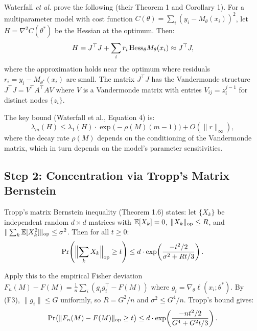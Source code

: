 Waterfall \emph{et al.}\cite{waterfall2006sloppy} prove the following (their Theorem 1 and Corollary 1). For a multiparameter model with cost function $C(\theta) = \sum_i (y_i - M_\theta(x_i))^2$, let $H = \nabla^2 C(\theta^*)$ be the Hessian at the optimum. Then:
\begin{equation}\label{eq:waterfall}
    H = J^\top J + \sum_i r_i \, \mathrm{Hess}_\theta M_\theta(x_i) \approx J^\top J,
\end{equation}
where the approximation holds near the optimum where residuals $r_i = y_i - M_{\theta^*}(x_i)$ are small. The matrix $J^\top J$ has the Vandermonde structure $J^\top J = V^\top A^\top A V$ where $V$ is a Vandermonde matrix with entries $V_{ij} = z_i^{j-1}$ for distinct nodes $\{z_i\}$.

The key bound (Waterfall et al., Equation 4) is:
\begin{equation}\label{eq:waterfall-bound}
    \lambda_m(H) \leq \lambda_1(H) \cdot \exp\bigl(-\rho(M)(m-1)\bigr) + O(\|r\|_\infty),
\end{equation}
where the decay rate $\rho(M)$ depends on the conditioning of the Vandermonde matrix, which in turn depends on the model's parameter sensitivities.

\subsection{Step 2: Concentration via Tropp's Matrix Bernstein}

Tropp's matrix Bernstein inequality\cite{tropp2012user} (Theorem 1.6) states: let $\{X_k\}$ be independent random $d \times d$ matrices with $\mathbb{E}[X_k] = 0$, $\|X_k\|_{\mathrm{op}} \leq R$, and $\|\sum_k \mathbb{E}[X_k^2]\|_{\mathrm{op}} \leq \sigma^2$. Then for all $t \geq 0$:
\begin{equation}\label{eq:tropp}
    \Pr\!\left(\Bigl\|\sum_k X_k\Bigr\|_{\mathrm{op}} \geq t\right) \leq d \cdot \exp\!\left(\frac{-t^2/2}{\sigma^2 + Rt/3}\right).
\end{equation}

Apply this to the empirical Fisher deviation $F_n(M) - F(M) = \frac{1}{n}\sum_i (g_i g_i^\top - F(M))$ where $g_i = \nabla_\theta \ell(x_i; \theta^*)$. By (F3), $\|g_i\| \leq G$ uniformly, so $R = G^2/n$ and $\sigma^2 \leq G^4/n$. Tropp's bound gives:
\begin{equation}\label{eq:fisher-concentration}
    \Pr\bigl(\|F_n(M) - F(M)\|_{\mathrm{op}} \geq t\bigr) \leq d \cdot \exp\!\left(\frac{-nt^2/2}{G^4 + G^2 t/3}\right).
\end{equation}

